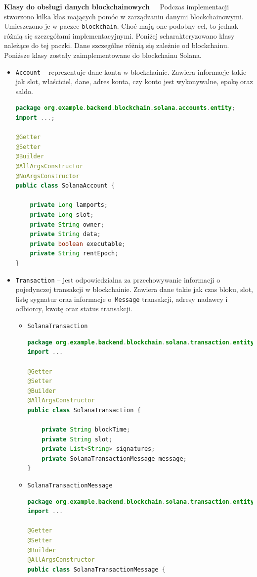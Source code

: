 \noindent \textbf{Klasy do obsługi danych blockchainowych~~}
Podczas implementacji stworzono kilka klas mających pomóc w zarządzaniu danymi blockchainowymi. Umieszczono je w paczce \texttt{blockchain}.
Choć mają one podobny cel, to jednak różnią się szczegółami implementacyjnymi. Poniżej scharakteryzowano klasy należące do tej paczki. Dane szczególne różnią się zależnie od blockchainu. Poniższe klasy zostały zaimplementowane do blockchainu Solana.
\begin{itemize}
\item \texttt{Account} -- reprezentuje dane konta w blockchainie. Zawiera informacje takie jak slot, właściciel, dane, adres konta, czy konto jest wykonywalne, epokę oraz saldo.  
	\begin{lstlisting}[language=Java, style=JavaStyle]
package org.example.backend.blockchain.solana.accounts.entity;
import ...;

@Getter
@Setter
@Builder
@AllArgsConstructor
@NoArgsConstructor
public class SolanaAccount {

	private Long lamports;
	private Long slot;
	private String owner;
	private String data;
	private boolean executable;
	private String rentEpoch;
}
	\end{lstlisting}
\item \texttt{Transaction} -- jest odpowiedzialna za przechowywanie informacji o pojedynczej transakcji w blockchainie. Zawiera dane takie jak czas bloku, slot, listę sygnatur oraz informacje o~\texttt{Message} transakcji, adresy nadawcy i odbiorcy, kwotę oraz status transakcji.
\begin{itemize}
\item \texttt{SolanaTransaction}
\begin{lstlisting}[language=Java, style=JavaStyle]
package org.example.backend.blockchain.solana.transaction.entity.transaction;
import ...

@Getter
@Setter
@Builder
@AllArgsConstructor
public class SolanaTransaction {

	private String blockTime;
	private String slot;
	private List<String> signatures;
	private SolanaTransactionMessage message;
}
\end{lstlisting}
\item \texttt{SolanaTransactionMessage}
\begin{lstlisting}[language=Java, style=JavaStyle]
package org.example.backend.blockchain.solana.transaction.entity.transaction.message;
import ...

@Getter
@Setter
@Builder
@AllArgsConstructor
public class SolanaTransactionMessage {


\end{lstlisting}
\end{itemize}
\end{itemize}
